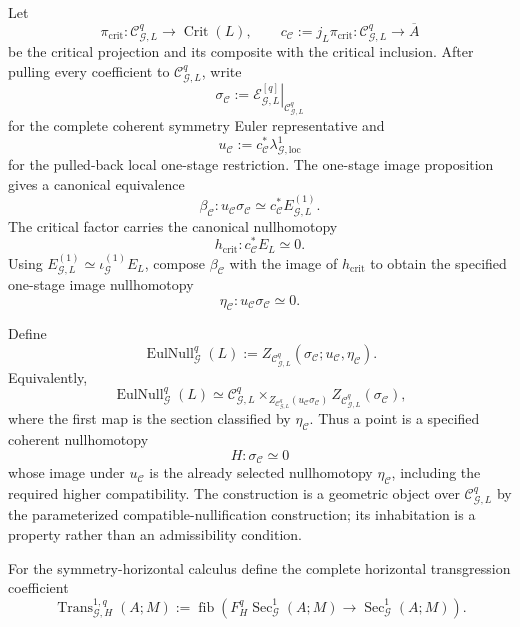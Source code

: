 \begin{definition}
\label{def:symmetry-noether-full-euler-nullification-object}
Let
\[
\pi_{\mathrm{crit}}:
\mathcal C_{\mathcal G,L}^{q}\longrightarrow\operatorname{Crit}(L),
\qquad
c_{\mathcal C}:=
j_L\pi_{\mathrm{crit}}:
\mathcal C_{\mathcal G,L}^{q}\longrightarrow\overline A
\]
be the critical projection and its composite with the critical inclusion.  After
pulling every coefficient to $\mathcal C_{\mathcal G,L}^{q}$, write
\[
\sigma_{\mathcal C}
:=
\left.\mathscr E_{\mathcal G,L}^{[q]}\right|_{\mathcal C_{\mathcal G,L}^{q}}
\]
for the complete coherent symmetry Euler representative and
\[
u_{\mathcal C}
:=
c_{\mathcal C}^*
\lambda_{\mathcal G,\mathrm{loc}}^1
\]
for the pulled-back local one-stage restriction.  The one-stage image proposition
gives a canonical equivalence
\[
\beta_{\mathcal C}:
u_{\mathcal C}\sigma_{\mathcal C}
\simeq
c_{\mathcal C}^*E_{\mathcal G,L}^{(1)}.
\]
The critical factor carries the canonical nullhomotopy
\[
h_{\mathrm{crit}}:
c_{\mathcal C}^*E_L\simeq0.
\]
Using
$E_{\mathcal G,L}^{(1)}\simeq\iota_{\mathcal G}^{(1)}E_L$, compose
$\beta_{\mathcal C}$ with the image of $h_{\mathrm{crit}}$ to obtain the specified
one-stage image nullhomotopy
\[
\eta_{\mathcal C}:
u_{\mathcal C}\sigma_{\mathcal C}\simeq0.
\]

Define
\[
\boxed{
\operatorname{EulNull}_{\mathcal G}^{q}(L)
:=
Z_{\mathcal C_{\mathcal G,L}^{q}}
\left(
\sigma_{\mathcal C};
u_{\mathcal C},
\eta_{\mathcal C}
\right).
}
\]
Equivalently,
\[
\operatorname{EulNull}_{\mathcal G}^{q}(L)
\simeq
\mathcal C_{\mathcal G,L}^{q}
\times_{Z_{\mathcal C_{\mathcal G,L}^{q}}
(u_{\mathcal C}\sigma_{\mathcal C})}
Z_{\mathcal C_{\mathcal G,L}^{q}}(\sigma_{\mathcal C}),
\]
where the first map is the section classified by $\eta_{\mathcal C}$.  Thus a
point is a specified coherent nullhomotopy
\[
H:\sigma_{\mathcal C}\simeq0
\]
whose image under $u_{\mathcal C}$ is the already selected nullhomotopy
$\eta_{\mathcal C}$, including the required higher compatibility.  The
construction is a geometric object over $\mathcal C_{\mathcal G,L}^{q}$ by the
parameterized compatible-nullification construction; its inhabitation is a
property rather than an admissibility condition.
\end{definition}

For the symmetry-horizontal calculus define the complete horizontal transgression
coefficient
\[
\operatorname{Trans}_{\mathcal G,H}^{1,q}(A;M)
:=
\operatorname{fib}
\left(
F_H^q\operatorname{Sec}_{\mathcal G}^{1}(A;M)
\longrightarrow
\operatorname{Sec}_{\mathcal G}^{1}(A;M)
\right).
\]

